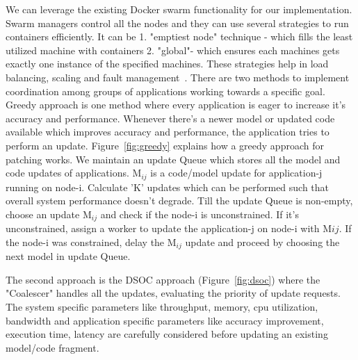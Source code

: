 We can leverage the existing Docker swarm functionality for our implementation. Swarm managers control all the nodes and they can use several strategies to run containers efficiently. It can be 1. "emptiest node" technique - which fills the least utilized machine with containers 2. "global"- which ensures each machines gets exactly one instance of the specified machines. These strategies help in load balancing, scaling and fault management~\cite{swarm_docker}.
There are two methods to implement coordination among groups of applications working towards a specific goal. Greedy approach is one method where every application is eager to increase it's accuracy and performance. Whenever there's a newer model or updated code available which improves accuracy and performance, the application tries to perform an update. Figure~\ref{fig:greedy} explains how a greedy approach for patching works. We maintain an update Queue which stores all the model and code updates of applications. M$_{ij}$ is a code/model update for application-j running on node-i. Calculate 'K' updates which can be performed such that overall system performance doesn't degrade. Till the update Queue is non-empty, choose an update M$_{ij}$ and check if the node-i is unconstrained. If it's unconstrained, assign a worker to update the application-j on node-i with M${ij}$. If the node-i was constrained, delay the M$_{ij}$ update and proceed by choosing the next model in update Queue.

The second approach is the DSOC approach (Figure~\ref{fig:dsoc}) where the "Coalescer" handles all the updates, evaluating the priority of update requests. The system specific parameters like throughput, memory, cpu utilization, bandwidth and application specific parameters like accuracy improvement, execution time, latency are carefully considered before updating an existing model/code fragment.

